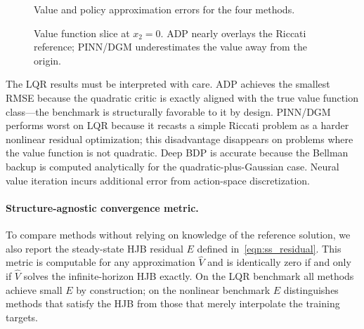\begin{figure}[H]
\centering

\caption{Value and policy approximation errors for the four methods.}
\label{fig:method-comparison}
\end{figure}

\begin{figure}[H]
\centering

\caption{Value function slice at $x_2=0$. ADP nearly overlays the Riccati reference; PINN/DGM underestimates the value away from the origin.}
\label{fig:value-slice}
\end{figure}

The LQR results must be interpreted with care.
ADP achieves the smallest RMSE because the quadratic critic is exactly
aligned with the true value function class---the benchmark is structurally
favorable to it by design.
PINN/DGM performs worst on LQR because it recasts a simple Riccati problem
as a harder nonlinear residual optimization; this disadvantage disappears
on problems where the value function is not quadratic.
Deep BDP is accurate because the Bellman backup is computed analytically
for the quadratic-plus-Gaussian case.
Neural value iteration incurs additional error from action-space discretization.

\paragraph{Structure-agnostic convergence metric.}
To compare methods without relying on knowledge of the reference solution,
we also report the steady-state HJB residual $E$ defined in~\eqref{eqn:ss_residual}.
This metric is computable for any approximation $\hat V$ and is identically
zero if and only if $\hat V$ solves the infinite-horizon HJB exactly.
On the LQR benchmark all methods achieve small $E$ by construction;
on the nonlinear benchmark $E$ distinguishes methods that satisfy the
HJB from those that merely interpolate the training targets.
